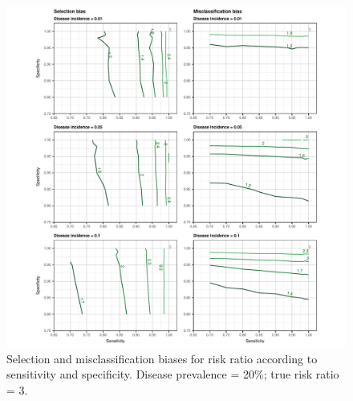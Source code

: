 \documentclass[utf8]{frontiers_suppmat} %
\begin{document}
\begin{figure}[htbp]
  \begin{center}
    \includegraphics[scale=.95]{master-risk20_contourX-1}
    \end{center}
  \caption{Selection and misclassification biases for risk ratio according
    to sensitivity and specificity. Disease prevalence = 20\%; true risk ratio =
    3.}
  \label{fig:risk_contourX5}
\end{figure}






%
\end{document}
